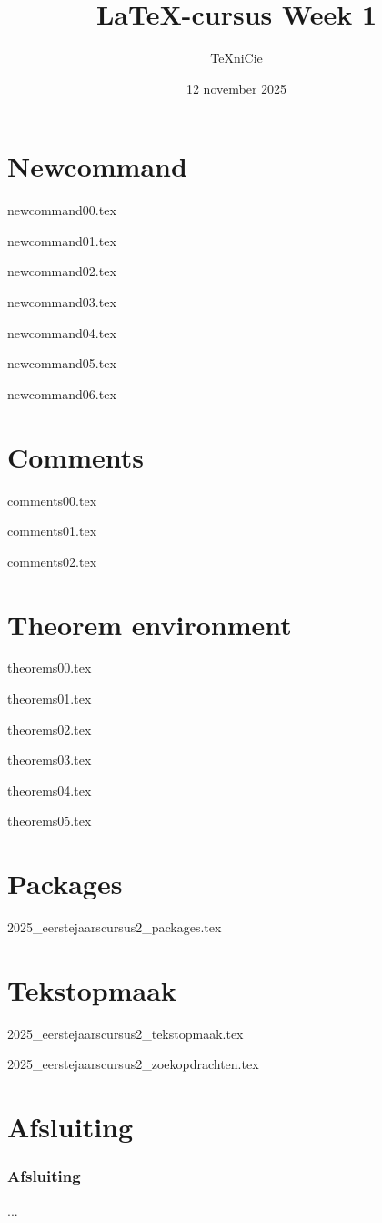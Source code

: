 \documentclass[allauthors,dutch]{../../cursuspresentatie}
\title{\LaTeX{}-cursus Week 1}
\author{\TeX niCie}
\date{12 november 2025}
\def\importslidej#1#2{%
	{#2}
}
\def\importslidey#1#2{%
	{#2}
}
\begin{document}
\section{Newcommand}
\def\placetarget{\hypertarget{newcommand}{}}

\importslidey{2025-eerstejaars_cursus_2}{newcommand00.tex}
\importslidey{2025-eerstejaars_cursus_2}{newcommand01.tex}
\importslidey{2025-eerstejaars_cursus_2}{newcommand02.tex}
\importslidey{2025-eerstejaars_cursus_2}{newcommand03.tex}
\importslidey{2025-eerstejaars_cursus_2}{newcommand04.tex}
\importslidey{2025-eerstejaars_cursus_2}{newcommand05.tex}
\importslidey{2025-eerstejaars_cursus_2}{newcommand06.tex}

\section{Comments}
\def\placetarget{\hypertarget{comments}{}}

\importslidey{2025-eerstejaars_cursus_2}{comments00.tex}
\importslidey{2025-eerstejaars_cursus_2}{comments01.tex}
\importslidey{2025-eerstejaars_cursus_2}{comments02.tex}

\section{Theorem environment}
\def\placetarget{\hypertarget{theorem_environment}{}}
\importslidey{2025-eerstejaars_cursus_2}{theorems00.tex}
\importslidey{2025-eerstejaars_cursus_2}{theorems01.tex}
\importslidey{2025-eerstejaars_cursus_2}{theorems02.tex}
\importslidey{2025-eerstejaars_cursus_2}{theorems03.tex}
\importslidey{2025-eerstejaars_cursus_2}{theorems04.tex}
\importslidey{2025-eerstejaars_cursus_2}{theorems05.tex}

\section{Packages}
\def\placetarget{\hypertarget{packages}{}}
\importslidej{cursus2}{2025_eerstejaarscursus2_packages.tex}

\section{Tekstopmaak}
\def\placetarget{\hypertarget{tekstopmaak}{}}
\importslidej{cursus2}{2025_eerstejaarscursus2_tekstopmaak.tex}
\importslidej{cursus2}{2025_eerstejaarscursus2_zoekopdrachten.tex}

\section{Afsluiting}
\begin{frame}
	\frametitle{Afsluiting}
	...
\end{frame}
	
\end{document}
